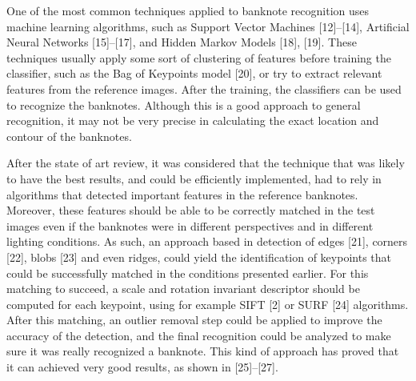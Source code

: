 One of the most common techniques applied to banknote recognition uses machine learning algorithms, such as Support Vector Machines [12]–[14], Artificial Neural Networks [15]–[17], and Hidden Markov Models [18], [19]. These techniques usually apply some sort of clustering of features before training the classifier, such as the Bag of Keypoints model [20], or try to extract relevant features from the reference images. After the training, the classifiers can be used to recognize the banknotes. Although this is a good approach to general recognition, it may not be very precise in calculating the exact location and contour of the banknotes.

After the state of art review, it was considered that the technique that was likely to have the best results, and could be efficiently implemented, had to rely in algorithms that detected important features in the reference banknotes. Moreover, these features should be able to be correctly matched in the test images even if the banknotes were in different perspectives and in different lighting conditions. As such, an approach based in detection of edges [21], corners [22], blobs [23] and even ridges, could yield the identification of keypoints that could be successfully matched in the conditions presented earlier. For this matching to succeed, a scale and rotation invariant descriptor should be computed for each keypoint, using for example SIFT [2] or SURF [24] algorithms. After this matching, an outlier removal step could be applied to improve the accuracy of the detection, and the final recognition could be analyzed to make sure it was really recognized a banknote. This kind of approach has proved that it can achieved very good results, as shown in [25]–[27].
